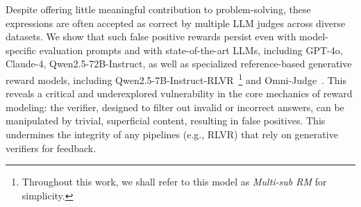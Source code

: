 Despite offering little meaningful contribution to problem-solving, these expressions are often accepted as correct by multiple LLM judges across diverse datasets. We show that such false positive rewards persist even with model-specific evaluation prompts and with state-of-the-art LLMs, including GPT-4o, Claude-4, Qwen2.5-72B-Instruct, as well as specialized reference-based generative reward models, including Qwen2.5-7B-Instruct-RLVR~\citep{su2025crossing}\footnote{Throughout this work, we shall refer to this model as \emph{Multi-sub RM} for simplicity.} and Omni-Judge~\citep{gao2024omnimathuniversalolympiadlevel}. This reveals a critical and underexplored vulnerability in the core mechanics of reward modeling: the verifier, designed to filter out invalid or incorrect answers, can be manipulated by trivial, superficial content, resulting in false positives. This undermines the integrity of any pipelines (e.g., RLVR) that rely on generative verifiers for feedback.




